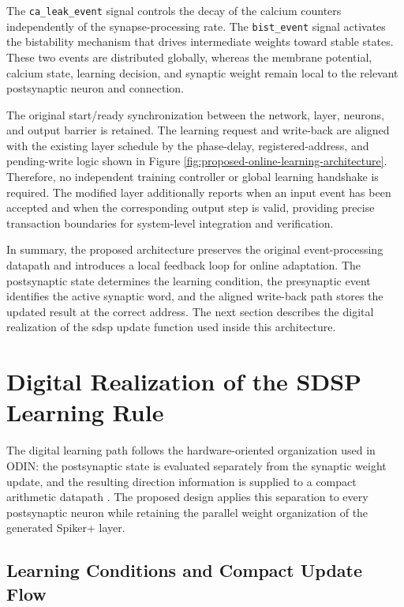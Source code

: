 The \texttt{ca\_leak\_event} signal controls the decay of the calcium counters independently of the synapse-processing rate. The \texttt{bist\_event} signal activates the bistability mechanism that drives intermediate weights toward stable states. These two events are distributed globally, whereas the membrane potential, calcium state, learning decision, and synaptic weight remain local to the relevant postsynaptic neuron and connection.

The original start/ready synchronization between the network, layer, neurons, and output barrier is retained. The learning request and write-back are aligned with the existing layer schedule by the phase-delay, registered-address, and pending-write logic shown in Figure \ref{fig:proposed-online-learning-architecture}. Therefore, no independent training controller or global learning handshake is required. The modified layer additionally reports when an input event has been accepted and when the corresponding output step is valid, providing precise transaction boundaries for system-level integration and verification.

In summary, the proposed architecture preserves the original event-processing datapath and introduces a local feedback loop for online adaptation. The postsynaptic state determines the learning condition, the presynaptic event identifies the active synaptic word, and the aligned write-back path stores the updated result at the correct address. The next section describes the digital realization of the \gls{sdsp} update function used inside this architecture.

\section{Digital Realization of the SDSP Learning Rule}
\label{subsec: digital sdsp realization}

The digital learning path follows the hardware-oriented organization used in ODIN: the postsynaptic state is evaluated separately from the synaptic weight update, and the resulting direction information is supplied to a compact arithmetic datapath \cite{Frenkel2019ODIN}. The proposed design applies this separation to every postsynaptic neuron while retaining the parallel weight organization of the generated Spiker+ layer.

\subsection{Learning Conditions and Compact Update Flow}

